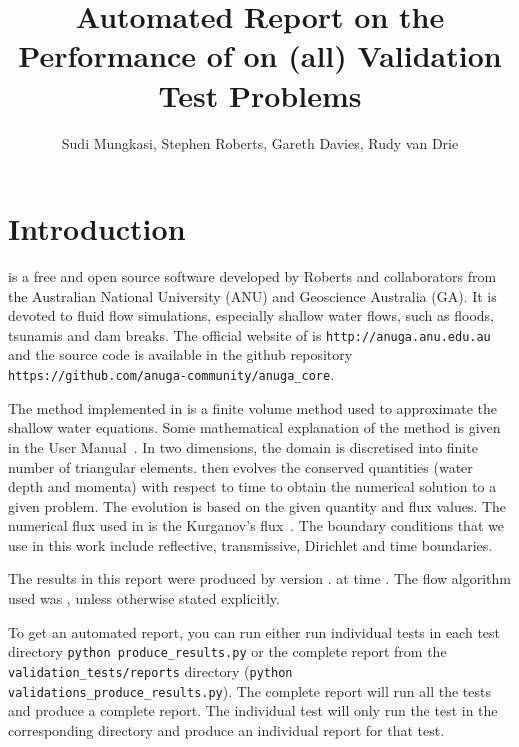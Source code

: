 \documentclass[11pt,a4paper]{report}
\begin{document}

\title{Automated Report on the Performance of \anuga{} on (all) Validation Test Problems}
\author{Sudi Mungkasi, Stephen Roberts, Gareth Davies, Rudy van Drie}    %
\maketitle
\tableofcontents

\chapter{Introduction}
\anuga{} is a free and open source software developed by Roberts and collaborators from the Australian
National University (ANU) and Geoscience Australia (GA). It is devoted to fluid flow simulations,
especially shallow water flows, such as floods, tsunamis and dam breaks. The official website of
\anuga{} is \verb|http://anuga.anu.edu.au| and the source code is available in the github repository 
\verb|https://github.com/anuga-community/anuga_core|.



The method implemented in \anuga{} is a finite volume method used to
approximate the shallow water equations. Some mathematical explanation of the method
is given in the \anuga{} User Manual~\cite{RNGS2010}. In two dimensions, the
domain is discretised into finite number of triangular elements. \anuga{}
then evolves the conserved quantities (water depth and momenta) with respect
to time to obtain the numerical solution to a given problem. The evolution
is based on the given quantity and flux values. The numerical flux used in
\anuga{} is the Kurganov's flux~\cite{KNP2001, KL2002}. The boundary conditions
that we use in this work include reflective, transmissive, Dirichlet
and time boundaries.


The results in this report were produced by \anuga{} version \majorR{}.\minorR{} at time \timeR.
The flow algorithm used was \alg{}, unless otherwise stated explicitly.

To get an automated report, you can run either run individual tests in each 
test directory \verb|python produce_results.py| or the complete report from the 
\verb|validation_tests/reports| directory (\verb|python validations_produce_results.py|). 
The complete report will run all the tests and produce a complete report. 
The individual test will only run the test in the corresponding directory and
 produce an individual report for that test.
\end{document}
